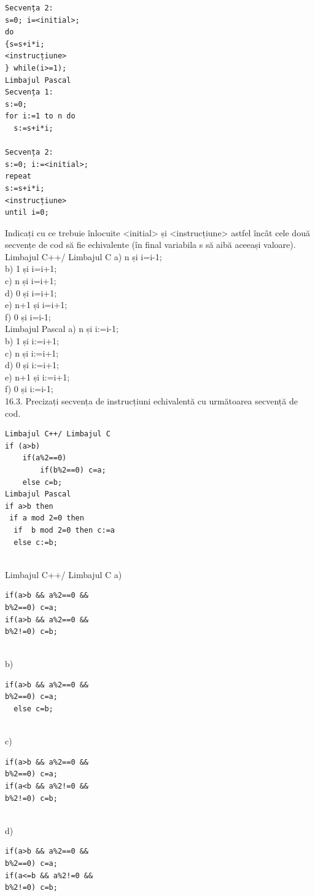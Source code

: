 {{\begin{verbatim}
Secvența 2: 
s=0; i=<initial>; 
do 
{s=s+i*i; 
<instrucțiune> 
} while(i>=1); 
Limbajul Pascal 
Secvența 1: 
s:=0; 
for i:=1 to n do  
  s:=s+i*i; 
 
Secvența 2: 
s:=0; i:=<initial>; 
repeat 
s:=s+i*i; 
<instrucțiune> 
until i=0; 
\end{verbatim}
Indicați cu ce trebuie înlocuite <initial> și <instrucțiune> astfel încât cele două secvențe de cod să fie echivalente (în final variabila s să aibă aceeași valoare).
\\
Limbajul C++/ Limbajul C
a) n și i=i-1;
\\
b) 1 și i=i+1;
\\
c) n și i=i+1;
\\
d) 0 și i=i+1;
\\
e) n+1 și i=i+1;
\\
f) 0 și i=i-1;
\\
Limbajul Pascal
a) n și i:=i-1;
\\
b) 1 și i:=i+1;
\\
c) n și i:=i+1;
\\
d) 0 și i:=i+1;
\\
e) n+1 și i:=i+1;
\\
f) 0 și i:=i-1;
\\
16.3. Precizați secvența de instrucțiuni echivalentă cu următoarea secvență de cod.
\begin{verbatim}
Limbajul C++/ Limbajul C
if (a>b)
    if(a%2==0)
        if(b%2==0) c=a;
    else c=b;
Limbajul Pascal 
if a>b then 
 if a mod 2=0 then   
  if  b mod 2=0 then c:=a 
  else c:=b;
\end{verbatim}
\\
Limbajul C++/ Limbajul C
a) \begin{verbatim}
if(a>b && a%2==0 && 
b%2==0) c=a; 
if(a>b && a%2==0 && 
b%2!=0) c=b;
\end{verbatim}
\\
b) \begin{verbatim}
if(a>b && a%2==0 && 
b%2==0) c=a;
  else c=b;
\end{verbatim}
\\
c) \begin{verbatim}
if(a>b && a%2==0 && 
b%2==0) c=a; 
if(a<b && a%2!=0 && 
b%2!=0) c=b;
\end{verbatim}
\\
d) \begin{verbatim}
if(a>b && a%2==0 && 
b%2==0) c=a; 
if(a<=b && a%2!=0 && 
b%2!=0) c=b; 
\end{verbatim}
\\
}}
